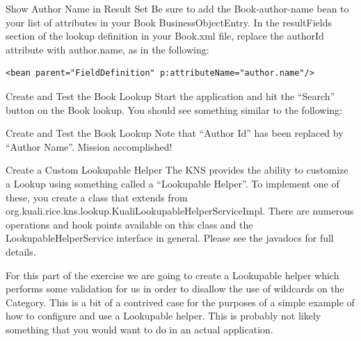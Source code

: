 \documentclass[xcolor=dvipsnames,14pt,professionalfonts]{beamer}
\begin{document}
\begin{frame}[fragile]{Show Author Name in Result Set}
 Be sure to add the Book-author-name bean to your list of attributes in your Book BusinessObjectEntry.
In the resultFields section of the lookup definition in your Book.xml file, replace the authorId attribute with author.name, as in the following:
    \begin{verbatim}
<bean parent="FieldDefinition" p:attributeName="author.name"/>
    \end{verbatim}
\end{frame}

\begin{frame}{Create and Test the Book Lookup}
  Start the application and hit the “Search” button
  on the Book lookup.  You should see something similar
  to the following:
  \end{frame}

  \begin{frame}{Create and Test the Book Lookup}
    Note that “Author Id” has been replaced by “Author Name”.
      Mission accomplished!
  \end{frame}

  \begin{frame}{Create a Custom Lookupable Helper}
    The KNS provides the ability to customize a Lookup using something
    called a “Lookupable Helper”.  To implement one of these, you
    create a class that extends from
    org.kuali.rice.kns.lookup.KualiLookupableHelperServiceImpl.  There
    are numerous operations and hook points available on this class
    and the LookupableHelperService interface in general.  Please see
    the javadocs for full details.           

    For this part of the exercise we are going to create a Lookupable
    helper which performs some validation for us in order to disallow
    the use of wildcards on the Category.  This is a bit of a
    contrived case for the purposes of a simple example of how to
    configure and use a Lookupable helper.  This is probably not
    likely something that you would want to do in an actual
    application.
  \end{frame}
\end{document}
